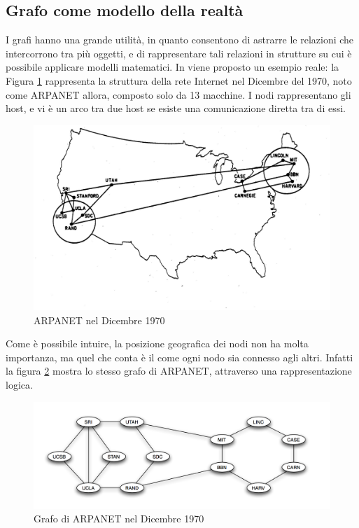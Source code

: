 \subsection{Grafo come modello della realtà}
I grafi hanno una grande utilità, in quanto consentono di astrarre le relazioni che intercorrono tra più oggetti, e di rappresentare tali relazioni in strutture su cui è possibile applicare modelli matematici. In \cite{easley2010networks} viene proposto un esempio reale: la Figura \ref{arpanet} rappresenta la struttura della rete Internet nel Dicembre del 1970, noto come ARPANET allora, composto solo da 13 macchine. I nodi rappresentano gli host, e vi è un arco tra due host se esiste una comunicazione diretta tra di essi.
\begin{figure}[h!]
	\centering
	\includegraphics[scale=.7]{img/arpanetdec1970.jpg}
	\caption{ARPANET nel Dicembre 1970}
	\label{arpanet}
\end{figure}
Come è possibile intuire, la posizione geografica dei nodi non ha molta importanza, ma quel che conta è il come ogni nodo sia connesso agli altri. Infatti la figura \ref{arpanet_graph} mostra lo stesso grafo di ARPANET, attraverso una rappresentazione logica.
\begin{figure}
	\centering
	\includegraphics[scale=.4]{img/arpanetdec1970_graph.png}
	\caption{Grafo di ARPANET nel Dicembre 1970}
	\label{arpanet_graph}
\end{figure}

